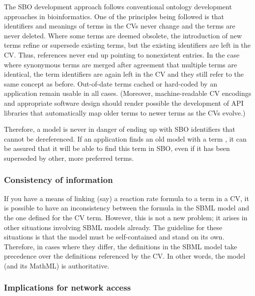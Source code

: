 The SBO development approach follows conventional ontology
development approaches in bioinformatics.  One of the principles
being followed is that identifiers and meanings of terms in the
CVs never change and the terms are never deleted.  Where some
terms are deemed obsolete, the introduction of new terms refine or
supersede existing terms, but the existing identifiers are left in
the CV.  Thus, references never end up pointing to nonexistent
entries.  In the case where synonymous terms are merged after
agreement that multiple terms are identical, the term identifiers
are again left in the CV and they still refer to the same concept
as before.  Out-of-date terms cached or hard-coded by an
application remain usable in all cases.  (Moreover, machine-readable
CV encodings and appropriate software design should render
possible the development of API libraries that automatically map
older terms to newer terms as the CVs evolve.)

Therefore, a model is never in danger of ending up with SBO
identifiers that cannot be dereferenced.  If an application finds
an old model with a term , it can be assured
that it will be able to find this term in SBO, even if it has been
superseded by other, more preferred terms.

\subsubsection{Consistency of information}

If you have a means of linking (say) a reaction rate formula to a
term in a CV, it is possible to have an inconsistency between the
formula in the SBML model and the one defined for the CV term.
However, this is not a new problem; it arises in other situations
involving SBML models already.  The guideline for these situations
is that the model must be self-contained and stand on its own.
Therefore, in cases where they differ, the definitions in the SBML
model take precedence over the definitions referenced by the CV.
In other words, the model (and its MathML) is authoritative.


\subsubsection{Implications for network access}
\label{sec:sbo-implications-for-network-access}

